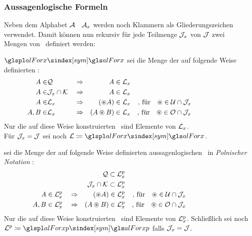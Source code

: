 \subsubsection{Aussagenlogische Formeln}%
\label{subsub:Formeln}

Neben dem Alphabet $\mathcal{A}$ \textbzw\ $\mathcal{A}_x$ werden noch Klammern als Gliederungszeichen verwendet.
Damit können nun rekursiv für jede Teilmenge $\mathcal{J}_x$ von $\mathcal{J}$ zwei Mengen von \Formeln\ definiert werden:

$\glsSym{alForx}$ sei die Menge der auf folgende Weise definierten %
:
\begin{align}
	A    \in & \mathcal{Q}               && \Rightarrow &           A  \in \mathcal{L}_x
	\\
	A    \in & \mathcal{J}_x \cap \mathcal{K}  && \Rightarrow &           A  \in \mathcal{L}_x
	\\
	A    \in & \mathcal{L}_x              && \Rightarrow &   (\circledast A) \in \mathcal{L}_x
	& & \text{, für} \quad \circledast \in \mathcal{U} \cap \mathcal{J}_x
	\\
	A, B \in & \mathcal{L}_x              && \Rightarrow & (A \circledast B) \in \mathcal{L}_x
	& & \text{, für} \quad \circledast \in \mathcal{O} \cap \mathcal{J}_x
	&&&&&&&&&&
\end{align}
Nur die auf diese Weise konstruierten \Formeln\ sind Elemente von $\mathcal{L}_x$.
\\Für $\mathcal{J}_x = \mathcal{J}$ sei noch $\alFor \defeq \glsSym{alForx}$.

 sei die Menge der auf folgende Weise definierten aussagenlogischen \Formeln\ in \emph{Polnischer Notation}%
:
\begin{align}
	&                                  & \mathcal{Q}              \subset \mathcal{L}^\mathrm{p}_x
	\\
	&                                  & \mathcal{J}_x \cap \mathcal{K} \subset \mathcal{L}^\mathrm{p}_x
	\\
	A    \in \mathcal{L}^\mathrm{p}_x & \quad \Rightarrow &  (\circledast A)         \in     \mathcal{L}^\mathrm{p}_x
	& & \text{, für}  \quad \circledast \in \mathcal{U} \cap \mathcal{J}_x
	\\
	A, B \in \mathcal{L}^\mathrm{p}_x & \quad \Rightarrow & (A \circledast B)        \in     \mathcal{L}^\mathrm{p}_x
	& & \text{, für}  \quad \circledast \in \mathcal{O} \cap \mathcal{J}_x
	&&&&&&&&&&
\end{align}
Nur die auf diese Weise konstruierten \Formeln\ sind Elemente von $\mathcal{L}^\mathrm{p}_x$.
Schließlich sei noch $\alForp \defeq \glsSym{alForxp}$ falls $\mathcal{J}_x = \mathcal{J}$.

